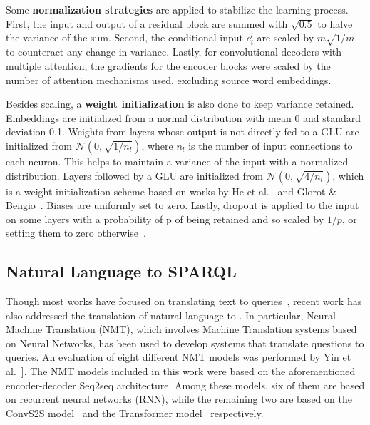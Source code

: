 Some \textbf{normalization strategies} are applied to stabilize the learning process. First, 
the input and output of a residual block are summed with $\sqrt{0.5}$ to halve the variance of 
the sum. Second, the conditional input $c_i^l$ are scaled by $m\sqrt{1/m}$ to counteract any 
change in variance. Lastly, for convolutional decoders with multiple attention, the gradients 
for the encoder blocks were scaled by the number of attention mechanisms used, excluding source 
word embeddings.

Besides scaling, a \textbf{weight initialization} is also done to keep variance retained. 
Embeddings are initialized from a normal distribution with mean 0 and standard deviation 0.1. 
Weights from layers whose output is not directly fed to a GLU are initialized from 
$\mathcal{N}(0, \sqrt{1/n_l})$, where $n_l$ is the number of input connections to each neuron. 
This helps to maintain a variance of the input with a normalized distribution. Layers followed 
by a GLU are initialized from $\mathcal{N}(0, \sqrt{4/n_l})$, which is a weight initialization 
scheme based on works by He et al.~\cite{semPar:HeZRS15} and Glorot \& Bengio~\cite{semPar:GlorotB10}. 
Biases are uniformly set to zero. Lastly, dropout is applied to the input on some layers with a 
probability of p of being retained and so scaled by $1/p$, or setting them to zero 
otherwise~\cite{semPar:SutskeverVL14}.

\subsection{Natural Language to SPARQL}
\label{cap2:theoFrame/semPar/nlToSparql}
Though most works have focused on translating text to \SQL{} queries~\cite{nmt:CaiXZYLL18,nmt:ZhongCoRR17}, 
recent work has also addressed the translation of natural language to \SPARQL{}. In particular, 
Neural Machine Translation (NMT), which involves Machine Translation systems based on Neural 
Networks, has been used to develop systems that translate questions to \SPARQL{} queries. An 
evaluation of eight different NMT models was performed by Yin et al.~\cite{nmt:nl-to-sparql-Yin19}]. 
The NMT models included in this work were based on the aforementioned encoder-decoder Seq2seq 
architecture. Among these models, six of them are based on recurrent neural networks (RNN), 
while the remaining two are based on the ConvS2S model~\cite{nmt:convS2S-GehringAGYD17} and 
the Transformer model~\cite{semPar:VaswaniSPUJGKP17} respectively.

